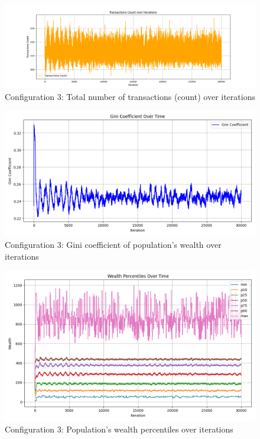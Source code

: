 \documentclass[english]{projectreport}
\begin{document}
    \begin{figure}[H]
        \centering
        \includegraphics[width=0.8\linewidth]{metrics_config3/metrics_config3_total_transactions_count.png}
        \caption{Configuration 3: Total number of transactions (count) over iterations}
        \label{fig:c0-total_transactions_count}
    \end{figure}

    \begin{figure}[H]
        \centering
        \includegraphics[width=0.8\linewidth]{metrics_config3/metrics_config3_gini_coefficient.png}
        \caption{Configuration 3: Gini coefficient of population's wealth over iterations}
        \label{fig:c0-gini_coefficient}
    \end{figure}

    \begin{figure}[H]
        \centering
        \includegraphics[width=0.8\linewidth]{metrics_config3/metrics_config3_wealth_perc_time.png}
        \caption{Configuration 3: Population's wealth percentiles over iterations}
        \label{fig:c0-wealth_perc_time}
    \end{figure}
\end{document}
